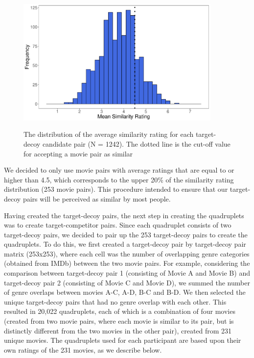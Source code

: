 \documentclass[12pt, a4paper]{article}
\begin{document}
\begin{figure}[htb!]
\centering
		\caption{The distribution of the average similarity rating for each target-decoy candidate pair (N = 1242). The dotted line is the cut-off value for accepting a movie pair as similar}
\includegraphics[width=0.9\textwidth]{figure2.pdf}
\label{fig:exp2_pilot}
\end{figure}

We decided to only use movie pairs with average ratings that are equal to or higher than 4.5, which corresponds to the upper 20\% of the similarity rating distribution (253 movie pairs). This procedure intended to ensure that our target-decoy pairs will be perceived as similar by most people.

Having created the target-decoy pairs, the next step in creating the quadruplets was to create target-competitor pairs. Since each quadruplet consists of two target-decoy pairs, we decided to pair up the 253 target-decoy pairs to create the quadruplets. To do this, we first created a target-decoy pair by target-decoy pair matrix (253x253), where each cell was the number of overlapping genre categories (obtained from IMDb) between the two movie pairs. For example, considering the comparison between target-decoy pair 1 (consisting of Movie A and Movie B) and target-decoy pair 2 (consisting of Movie C and Movie D), we summed the number of genre overlaps between movies A-C, A-D, B-C and B-D. We then selected the unique target-decoy pairs that had no genre overlap with each other. This resulted in 20,022 quadruplets, each of which is a combination of four movies (created from two movie pairs, where each movie is similar to its pair, but is distinctly different from the two movies in the other pair), created from 231 unique movies. The quadruplets used for each participant are based upon their own ratings of the 231 movies, as we describe below.
\end{document}

